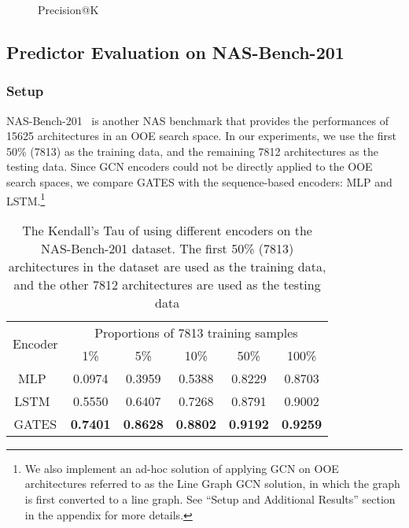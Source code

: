 \documentclass[runningheads]{llncs}
\begin{document}
\begin{figure*}[tb]
  \begin{center}
    \caption{Precision@K}
  \end{center}
  \label{fig:patk}
\end{figure*}


\subsection{Predictor Evaluation on NAS-Bench-201}
\label{sec:exp-nasbench201}

\subsubsection{Setup}
NAS-Bench-201~\cite{Dong2020NAS-Bench-201} is another NAS benchmark that provides the performances of 
15625 architectures in an OOE search space. In our experiments, we use the first 50\% (7813) as the training data, and the remaining 7812 architectures as the testing data.
Since GCN encoders could not be directly applied to the OOE search spaces, 
we compare GATES with the sequence-based encoders: MLP and LSTM.\footnote{We also implement an ad-hoc solution of applying GCN on OOE architectures referred to as the Line Graph GCN solution, in which the graph is first converted to a line graph. See ``Setup and Additional Results'' section in the appendix for more details.} 

\addtolength{\tabcolsep}{1pt}
\begin{table*}[tb]
\caption{The Kendall’s Tau of using different encoders on the NAS-Bench-201 dataset. The first 50\% (7813) architectures in the dataset are used as the training data, and the other 7812 architectures are used as the testing data}
\label{table:gates-nb201}
\begin{center}
\begin{tabular}{cccccc}
\toprule
\multirow{2}{*}{Encoder} & \multicolumn{5}{c}{Proportions of 7813 training samples}\\ 
\cmidrule(lr){2-6} & 1\% & 5\% & 10\% & 50\% & 100\% \\\midrule
MLP~\cite{wang2018alphax}   &  0.0974 & 0.3959 & 0.5388 & 0.8229 & 0.8703\\
  LSTM~\cite{wang2018alphax}  & 0.5550 & 0.6407 & 0.7268 & 0.8791 & 0.9002\\
\hline
GATES & {\bf 0.7401} & {\bf 0.8628} & {\bf 0.8802} & {\bf 0.9192} & {\bf 0.9259}\\\bottomrule
\end{tabular}
\end{center}
\end{table*}
\addtolength{\tabcolsep}{-1pt}
\end{document}
